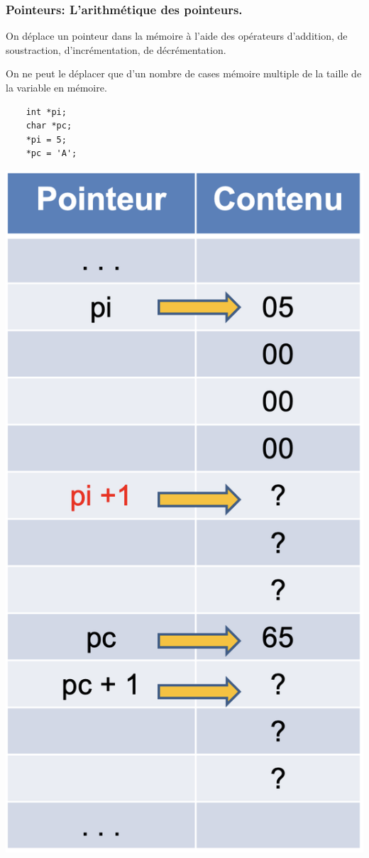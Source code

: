 \documentclass{beamer}
\begin{document}
 
\begin{frame}[fragile]
\frametitle{Pointeurs: L'arithmétique des pointeurs.}

\begin{multicols}{2}
On déplace  un pointeur dans la mémoire à l'aide des opérateurs d'addition, de soustraction, d'incrémentation, de décrémentation.

On ne peut le déplacer que d'un nombre de cases mémoire multiple de la taille de la variable en mémoire.
\begin{verbatim}  
    int *pi;   	
    char *pc;	
    *pi = 5;	
    *pc = 'A';
\end{verbatim}

\includegraphics[scale=0.3]{pointeur2.png} 
\end{multicols}

\end{frame}
  
\end{document}
